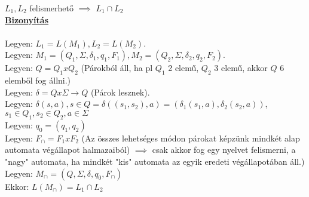 \documentclass{beamer}
\newcommand{\msmallskip}{\vspace{0.3em}}
\newcommand{\mmedskip}{\vspace{0.5em}}
\newcommand{\mbigskip}{\vspace{1em}}
\begin{document}
\begin{frame}
\begin{tcolorbox}[title={Tétel: Felismerhető nyelvek metszete}]
$L_1, L_2$ felismerhető $\implies$ $L_1 \cap L_2$\\
\tcblower
\msmallskip
\underline{\textbf{Bizonyítás}}\\
\mmedskip
\\
Legyen: $L_1 = L(M_1), L_2 = L(M_2)$.\\
Legyen: $M_1 = (Q_1, \Sigma , {\delta}_1, q_1, F_1), M_2 = (Q_2, \Sigma , {\delta}_2, q_2, F_2)$.\\
Legyen: $Q = Q_1 x Q_2$ (Párokból áll, ha pl $Q_1$ 2 elemű, $Q_2$ 3 elemű, akkor $Q$ 6 elemből fog állni.)\\
Legyen: $\delta = Q x \Sigma \rightarrow Q$ (Párok lesznek).\\
Legyen: $\delta(s, a), s \in Q = \delta((s_1, s_2), a) = ({\delta}_1(s_1, a), {\delta}_2(s_2, a))$, $s_1 \in Q_1, s_2 \in Q_2, a \in \Sigma$\\
\mbigskip
Legyen: $q_0 = (q_1, q_2)$\\
Legyen: \underline{\textbf{$F_{\cap} = F_1 x F_2$}} (Az összes lehetséges módon párokat képzünk mindkét alap automata végállapot halmazaiból) $\implies$ csak akkor fog egy nyelvet felismerni, a "nagy" automata, ha mindkét "kis" automata az egyik eredeti végállapotában áll.)\\
\msmallskip
Legyen: $M_{\cap} = (Q, \Sigma , \delta , q_0, F_{\cap})$\\
\mbigskip
Ekkor: \underline{$L(M_{\cap}) = L_1 \cap L_2$}\\
\end{tcolorbox}

\end{frame}
\end{document}
